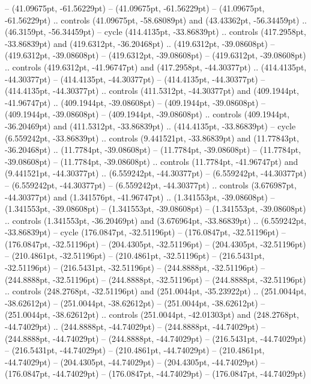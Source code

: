  -- (41.09675pt, -61.56229pt)
 -- (41.09675pt, -61.56229pt)
 -- (41.09675pt, -61.56229pt) .. controls (41.09675pt, -58.68089pt) and (43.43362pt, -56.34459pt) .. (46.3159pt, -56.34459pt) -- cycle
(414.4135pt, -33.86839pt) .. controls (417.2958pt, -33.86839pt) and (419.6312pt, -36.20468pt) .. (419.6312pt, -39.08608pt)
 -- (419.6312pt, -39.08608pt)
 -- (419.6312pt, -39.08608pt)
 -- (419.6312pt, -39.08608pt) .. controls (419.6312pt, -41.96747pt) and (417.2958pt, -44.30377pt) .. (414.4135pt, -44.30377pt)
 -- (414.4135pt, -44.30377pt)
 -- (414.4135pt, -44.30377pt)
 -- (414.4135pt, -44.30377pt) .. controls (411.5312pt, -44.30377pt) and (409.1944pt, -41.96747pt) .. (409.1944pt, -39.08608pt)
 -- (409.1944pt, -39.08608pt)
 -- (409.1944pt, -39.08608pt)
 -- (409.1944pt, -39.08608pt) .. controls (409.1944pt, -36.20469pt) and (411.5312pt, -33.86839pt) .. (414.4135pt, -33.86839pt) -- cycle
(6.559242pt, -33.86839pt) .. controls (9.441521pt, -33.86839pt) and (11.77843pt, -36.20468pt) .. (11.7784pt, -39.08608pt)
 -- (11.7784pt, -39.08608pt)
 -- (11.7784pt, -39.08608pt)
 -- (11.7784pt, -39.08608pt) .. controls (11.7784pt, -41.96747pt) and (9.441521pt, -44.30377pt) .. (6.559242pt, -44.30377pt)
 -- (6.559242pt, -44.30377pt)
 -- (6.559242pt, -44.30377pt)
 -- (6.559242pt, -44.30377pt) .. controls (3.676987pt, -44.30377pt) and (1.341576pt, -41.96747pt) .. (1.341553pt, -39.08608pt)
 -- (1.341553pt, -39.08608pt)
 -- (1.341553pt, -39.08608pt)
 -- (1.341553pt, -39.08608pt) .. controls (1.341553pt, -36.20469pt) and (3.676964pt, -33.86839pt) .. (6.559242pt, -33.86839pt) -- cycle
(176.0847pt, -32.51196pt) -- (176.0847pt, -32.51196pt)
 -- (176.0847pt, -32.51196pt)
 -- (204.4305pt, -32.51196pt)
 -- (204.4305pt, -32.51196pt)
 -- (210.4861pt, -32.51196pt)
 -- (210.4861pt, -32.51196pt)
 -- (216.5431pt, -32.51196pt)
 -- (216.5431pt, -32.51196pt)
 -- (244.8888pt, -32.51196pt)
 -- (244.8888pt, -32.51196pt)
 -- (244.8888pt, -32.51196pt)
 -- (244.8888pt, -32.51196pt) .. controls (248.2768pt, -32.51196pt) and (251.0044pt, -35.23922pt) .. (251.0044pt, -38.62612pt)
 -- (251.0044pt, -38.62612pt)
 -- (251.0044pt, -38.62612pt)
 -- (251.0044pt, -38.62612pt) .. controls (251.0044pt, -42.01303pt) and (248.2768pt, -44.74029pt) .. (244.8888pt, -44.74029pt)
 -- (244.8888pt, -44.74029pt)
 -- (244.8888pt, -44.74029pt)
 -- (244.8888pt, -44.74029pt)
 -- (216.5431pt, -44.74029pt)
 -- (216.5431pt, -44.74029pt)
 -- (210.4861pt, -44.74029pt)
 -- (210.4861pt, -44.74029pt)
 -- (204.4305pt, -44.74029pt)
 -- (204.4305pt, -44.74029pt)
 -- (176.0847pt, -44.74029pt)
 -- (176.0847pt, -44.74029pt)
 -- (176.0847pt, -44.74029pt)
